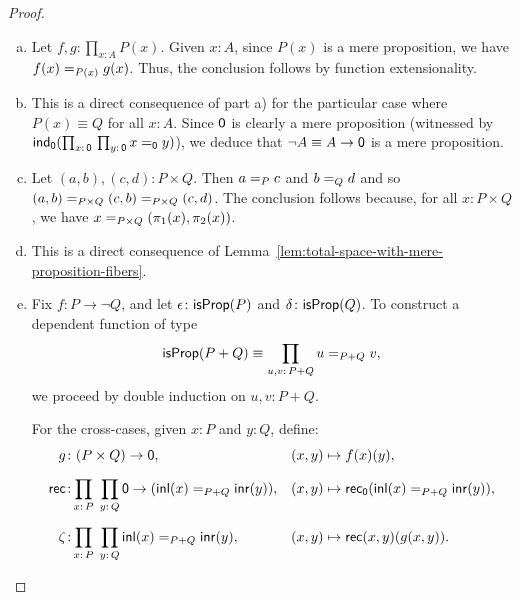 \begin{proof}${}$
    \begin{enumerate}[a)]
        \item Let $f,g\colon\prod_{x\colon A}P(x)$. Given $x\colon A$, since $P(x)$ is a mere proposition, we have $f(x)\mathrel{=_{P(x)}}g(x)$. Thus, the conclusion follows by function extensionality.

        \item This is a direct consequence of part a) for the particular case where $P(x)\equiv Q$ for all $x\colon A$. Since $\mathsf{0}$ is clearly a mere proposition (witnessed by $\fun{ind}_{\fun0}(\prod_{x\colon\fun0}\,\prod_{y\colon\fun0}x\eq{\fun0}y)$), we deduce that $\neg A\equiv A\to\mathsf{0}$ is a mere proposition.

        \item Let $(a,b),(c,d)\colon P\times Q$. Then $a\mathrel{=_{P}}c$ and $b\mathrel{=_{Q}}d$ and so $(a,b)\mathrel{=_{P\times Q}}(c,b)\mathrel{=_{P\times Q}}(c,d)$. The conclusion follows because, for all $x\colon P\times Q$, we have $x\mathrel{=_{P\times Q}}(\pi_1(x),\pi_2(x))$.

        
        \item This is a direct consequence of Lemma~\ref{lem:total-space-with-mere-proposition-fibers}.

        \item Fix $f\colon P\to\neg Q$, and let $\epsilon\colon\fun{isProp}(P)$ and $\delta\colon\fun{isProp}(Q)$. To construct a dependent function of type
        \[
            \fun{isProp}(P+Q)\equiv\prod_{u,v\colon P+Q}u\eq{P+Q}v,
        \]
        we proceed by double induction on $u,v\colon P+Q$.

        For the cross-cases, given $x\colon P$ and $y\colon Q$, define:
        \begin{align*}
            g&\colon(P\times Q)\to\fun0,
            &(x,y)&\mapsto f(x)(y),\\[2mm]
            \fun{rec}&\colon\!\!\prod_{x\colon P}\;\prod_{y\colon Q}
                \fun0\to(\fun{inl}(x)\eq{P+Q}\fun{inr}(y)),
            &(x,y)&\mapsto\fun{rec}_{\fun0}(\fun{inl}(x)\eq{P+Q}\fun{inr}(y)),\\[2mm]
            \zeta&\colon\!\!\prod_{x\colon P}\;\prod_{y\colon Q}
                \fun{inl}(x)\eq{P+Q}\fun{inr}(y),
            &(x,y)&\mapsto\fun{rec}(x,y)(g(x,y)).
        \end{align*}
    

\end{enumerate}
\end{proof}
